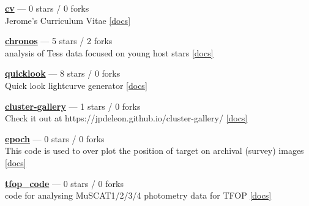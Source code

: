 \item \href{https://github.com/jpdeleon/cv}{{\bf cv}} --- 0 stars / 0 forks \\
Jerome's Curriculum Vitae \href{https://raw.githubusercontent.com/jpdeleon/cv/main-pdf/tex/cv_pubs.pdf}{[docs]}

\item \href{https://github.com/jpdeleon/chronos}{{\bf chronos}} --- 5 stars / 2 forks \\
analysis of Tess data focused on young host stars \href{None}{[docs]}

\item \href{https://github.com/jpdeleon/quicklook}{{\bf quicklook}} --- 8 stars / 0 forks \\
Quick look lightcurve generator \href{None}{[docs]}

\item \href{https://github.com/jpdeleon/cluster-gallery}{{\bf cluster-gallery}} --- 1 stars / 0 forks \\
Check it out at https://jpdeleon.github.io/cluster-gallery/ \href{None}{[docs]}

\item \href{https://github.com/jpdeleon/epoch}{{\bf epoch}} --- 0 stars / 0 forks \\
This code is used to over plot the position of target on archival (survey) images \href{None}{[docs]}

\item \href{https://github.com/jpdeleon/tfop_code}{{\bf tfop{\_}code}} --- 0 stars / 0 forks \\
code for analysing MuSCAT1/2/3/4 photometry data for TFOP \href{None}{[docs]}